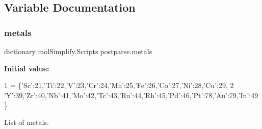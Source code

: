 \subsection{Variable Documentation}
\mbox{\label{namespacemolSimplify_1_1Scripts_1_1postparse_af6144507bc4cf4e5b0a26d5635fdf234}} 
\subsubsection{\texorpdfstring{metals}{metals}}
{\footnotesize\ttfamily dictionary mol\+Simplify.\+Scripts.\+postparse.\+metals}

{\bfseries Initial value\+:}
\begin{DoxyCode}
1 =  \{\textcolor{stringliteral}{'Sc'}:21,\textcolor{stringliteral}{'Ti'}:22,\textcolor{stringliteral}{'V'}:23,\textcolor{stringliteral}{'Cr'}:24,\textcolor{stringliteral}{'Mn'}:25,\textcolor{stringliteral}{'Fe'}:26,\textcolor{stringliteral}{'Co'}:27,\textcolor{stringliteral}{'Ni'}:28,\textcolor{stringliteral}{'Cu'}:29,
2           \textcolor{stringliteral}{'Y'}:39,\textcolor{stringliteral}{'Zr'}:40,\textcolor{stringliteral}{'Nb'}:41,\textcolor{stringliteral}{'Mo'}:42,\textcolor{stringliteral}{'Tc'}:43,\textcolor{stringliteral}{'Ru'}:44,\textcolor{stringliteral}{'Rh'}:45,\textcolor{stringliteral}{'Pd'}:46,\textcolor{stringliteral}{'Pt'}:78,\textcolor{stringliteral}{'Au'}:79,\textcolor{stringliteral}{'In'}:49\}
\end{DoxyCode}


List of metals. 

